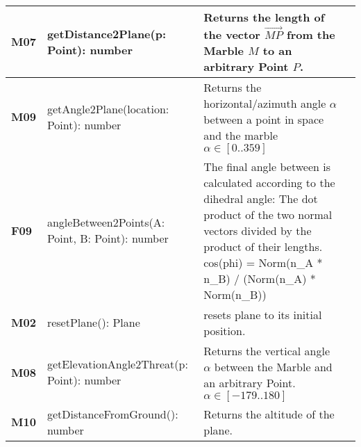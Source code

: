 \begin{xltabular}{\textwidth}{|M{1.2cm}|X|X|M{3cm}|}
  \textbf{M07} & {\ttfamily getDistance2Plane(p: Point): number} & Returns the length of the vector $\vec{MP}$ from the Marble $M$ to an arbitrary Point $P$. &  \\ \hline 
  \textbf{M09} & {\ttfamily getAngle2Plane(location: Point): number} & Returns the horizontal/azimuth angle $\alpha$ between a point in space and the marble $\alpha\in\left[0..359\right]$ &  \\ \hline 
  \textbf{F09} & {\ttfamily angleBetween2Points(A: Point, B: Point): number} & The final angle between is calculated according to the dihedral angle: The dot product of the two normal vectors divided by the product of their lengths. \newline cos(phi) = Norm(n_A * n_B) / (Norm(n_A) * Norm(n_B)) &  \\ \hline 
  \textbf{M02} & {\ttfamily resetPlane(): Plane } & resets plane to its initial position. &  \\ \hline 
  \textbf{M08} & {\ttfamily getElevationAngle2Threat(p: Point): number} & Returns the vertical angle $\alpha$ between the Marble and an arbitrary Point. $\alpha\in\left[-179..180\right]$ &  \\ \hline 
  \textbf{M10} & {\ttfamily getDistanceFromGround(): number} & Returns the altitude of the plane. &  \\ \hline 
  
\end{xltabular} 
 \egroup 
 \color{default}